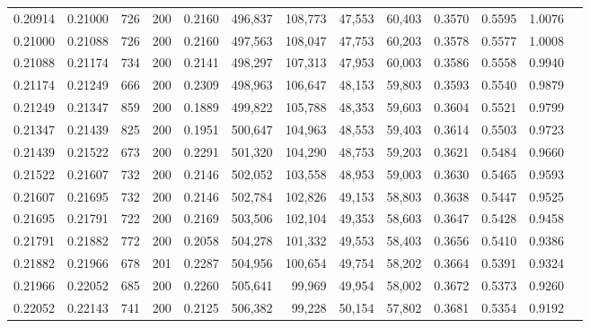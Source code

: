\begin{tabular}{rrrrrrrrrrrrr}
0.20914 & 0.21000 &    726 & 200 &                                     0.2160 & 496,837 & 108,773 &  47,553 &  60,403 & 0.3570 & 0.5595 & 1.0076 \\
0.21000 & 0.21088 &    726 & 200 &                                     0.2160 & 497,563 & 108,047 &  47,753 &  60,203 & 0.3578 & 0.5577 & 1.0008 \\
0.21088 & 0.21174 &    734 & 200 &                                     0.2141 & 498,297 & 107,313 &  47,953 &  60,003 & 0.3586 & 0.5558 & 0.9940 \\
0.21174 & 0.21249 &    666 & 200 &                                     0.2309 & 498,963 & 106,647 &  48,153 &  59,803 & 0.3593 & 0.5540 & 0.9879 \\
0.21249 & 0.21347 &    859 & 200 &                                     0.1889 & 499,822 & 105,788 &  48,353 &  59,603 & 0.3604 & 0.5521 & 0.9799 \\
0.21347 & 0.21439 &    825 & 200 &                                     0.1951 & 500,647 & 104,963 &  48,553 &  59,403 & 0.3614 & 0.5503 & 0.9723 \\
0.21439 & 0.21522 &    673 & 200 &                                     0.2291 & 501,320 & 104,290 &  48,753 &  59,203 & 0.3621 & 0.5484 & 0.9660 \\
0.21522 & 0.21607 &    732 & 200 &                                     0.2146 & 502,052 & 103,558 &  48,953 &  59,003 & 0.3630 & 0.5465 & 0.9593 \\
0.21607 & 0.21695 &    732 & 200 &                                     0.2146 & 502,784 & 102,826 &  49,153 &  58,803 & 0.3638 & 0.5447 & 0.9525 \\
0.21695 & 0.21791 &    722 & 200 &                                     0.2169 & 503,506 & 102,104 &  49,353 &  58,603 & 0.3647 & 0.5428 & 0.9458 \\
0.21791 & 0.21882 &    772 & 200 &                                     0.2058 & 504,278 & 101,332 &  49,553 &  58,403 & 0.3656 & 0.5410 & 0.9386 \\
0.21882 & 0.21966 &    678 & 201 &                                     0.2287 & 504,956 & 100,654 &  49,754 &  58,202 & 0.3664 & 0.5391 & 0.9324 \\
0.21966 & 0.22052 &    685 & 200 &                                     0.2260 & 505,641 &  99,969 &  49,954 &  58,002 & 0.3672 & 0.5373 & 0.9260 \\
0.22052 & 0.22143 &    741 & 200 &                                     0.2125 & 506,382 &  99,228 &  50,154 &  57,802 & 0.3681 & 0.5354 & 0.9192 \\

\end{tabular}
